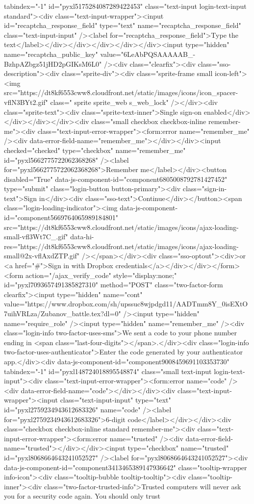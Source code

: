 {tabindex="-1" id="pyxl5175284087289422453" class="text-input login-text-input standard"><div class="text-input-wrapper"><input id="recaptcha_response_field" type="text" name="recaptcha_response_field" class="text-input-input" /><label for="recaptcha_response_field">Type the text</label></div></div></div></div></div><input type="hidden" name="recaptcha_public_key" value="6LeAbPQSAAAAAB_-BzhpAZbgz51jHD2pGIKsM6L0" /><div class="clearfix"><div class="sso-description"><div class="sprite-div"><div class="sprite-frame small icon-left"><img src="https://dt8kf6553cww8.cloudfront.net/static/images/icons/icon_spacer-vflN3BYt2.gif" class=" sprite sprite_web s_web_lock" /></div><div class="sprite-text"><div class="sprite-text-inner">Single sign-on enabled</div></div></div></div><div class="small checkbox checkbox-inline remember-me"><div class="text-input-error-wrapper"><form:error name="remember_me" /><div data-error-field-name="remember_me"></div></div><input checked="checked" type="checkbox" name="remember_me" id="pyxl5662775722062368268" /><label for="pyxl5662775722062368268">Remember me</label></div><button disabled="True" data-js-component-id="component6805008792781427452" type="submit" class="login-button button-primary"><div class="sign-in-text">Sign in</div><div class="sso-text">Continue</div></button><span class="login-loading-indicator"><img data-js-component-id="component5669764065989184801" src="https://dt8kf6553cww8.cloudfront.net/static/images/icons/ajax-loading-small-vfl3Wt7C_.gif" data-hi-res="https://dt8kf6553cww8.cloudfront.net/static/images/icons/ajax-loading-small@2x-vflAxdZTP.gif" /></span></div><div class="sso-optout"><div>or <a href="#">Sign in with Dropbox credentials</a></div></div></form> <form action="/ajax_verify_code" style="display:none;" id="pyxl7093657491385827310" method="POST" class="two-factor-form clearfix"><input type="hidden" name="cont" value="https://www.dropbox.com/sh/upssuc8wjpdgd11/AADTmm8Y_0isEXtO7uihVRLza/Zubanov_battle.tex?dl=0" /><input type="hidden" name="require_role" /><input type="hidden" name="remember_me" /><div class="login-info two-factor-uses-sms">We sent a code to your phone number ending in <span class="last-four-digits"></span>.</div><div class="login-info two-factor-uses-authenticator">Enter the code generated by your authenticator app.</div><div data-js-component-id="component9008459691103353730" tabindex="-1" id="pyxl148724018895548874" class="small text-input login-text-input"><div class="text-input-error-wrapper"><form:error name="code" /><div data-error-field-name="code"></div></div><div class="text-input-wrapper"><input class="text-input-input" type="text" id="pyxl2759234943612683326" name="code" /><label for="pyxl2759234943612683326">6-digit code</label></div></div><div class="checkbox checkbox-inline standard remember-me"><div class="text-input-error-wrapper"><form:error name="trusted" /><div data-error-field-name="trusted"></div></div><input type="checkbox" name="trusted" id="pyxl8068664643241052527" /><label for="pyxl8068664643241052527"><div data-js-component-id="component3413465389147936642" class="tooltip-wrapper info-icon"><div class="tooltip-bubble tooltip-tooltip"><div class="tooltip-inner"><div class="two-factor-trusted-info">Trusted computers will never ask you for a security code again. You should only trust }
